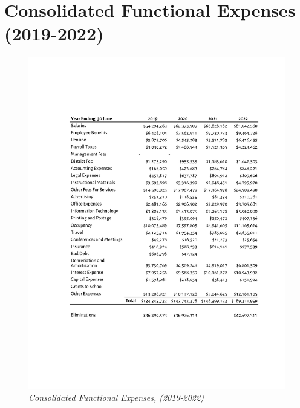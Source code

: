 
\chapter{Consolidated Functional Expenses (2019-2022)}\noindent%
\label{ch:consolidated_functional_expenses_2019-2022}

\begin{figure}
  \caption[Consolidated Functional Expenses (2019–2022)]{\textit{Consolidated Functional Expenses, (2019-2022)}}%
  \label{fig:consolidated_functional_expenses_2019-2022} %
  \raggedright
  \includegraphics[scale=0.8]{Consolidated_Functional_Expenses_2019-2022} %
\end{figure}

